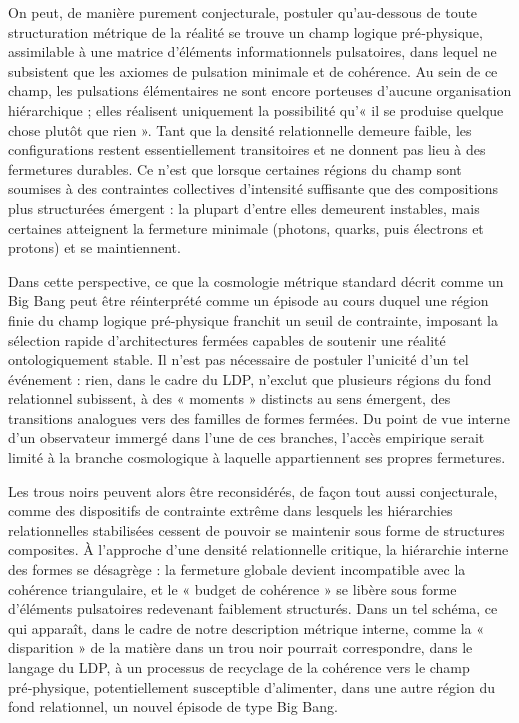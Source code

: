 \documentclass[11pt,a4paper]{article}
\begin{document}
On peut, de manière purement conjecturale, postuler qu’au-dessous de toute structuration métrique de la réalité se trouve un champ logique pré‑physique, assimilable à une matrice d’éléments informationnels pulsatoires, dans lequel ne subsistent que les axiomes de pulsation minimale et de cohérence. Au sein de ce champ, les pulsations élémentaires ne sont encore porteuses d’aucune organisation hiérarchique ; elles réalisent uniquement la possibilité qu’« il se produise quelque chose plutôt que rien ». Tant que la densité relationnelle demeure faible, les configurations restent essentiellement transitoires et ne donnent pas lieu à des fermetures durables. Ce n’est que lorsque certaines régions du champ sont soumises à des contraintes collectives d’intensité suffisante que des compositions plus structurées émergent : la plupart d’entre elles demeurent instables, mais certaines atteignent la fermeture minimale (photons, quarks, puis électrons et protons) et se maintiennent.

Dans cette perspective, ce que la cosmologie métrique standard décrit comme un Big Bang peut être réinterprété comme un épisode au cours duquel une région finie du champ logique pré‑physique franchit un seuil de contrainte, imposant la sélection rapide d’architectures fermées capables de soutenir une réalité ontologiquement stable. Il n’est pas nécessaire de postuler l’unicité d’un tel événement : rien, dans le cadre du LDP, n’exclut que plusieurs régions du fond relationnel subissent, à des « moments » distincts au sens émergent, des transitions analogues vers des familles de formes fermées. Du point de vue interne d’un observateur immergé dans l’une de ces branches, l’accès empirique serait limité à la branche cosmologique à laquelle appartiennent ses propres fermetures. 

Les trous noirs peuvent alors être reconsidérés, de façon tout aussi conjecturale, comme des dispositifs de contrainte extrême dans lesquels les hiérarchies relationnelles stabilisées cessent de pouvoir se maintenir sous forme de structures composites. À l’approche d’une densité relationnelle critique, la hiérarchie interne des formes se désagrège : la fermeture globale devient incompatible avec la cohérence triangulaire, et le « budget de cohérence » se libère sous forme d’éléments pulsatoires redevenant faiblement structurés. Dans un tel schéma, ce qui apparaît, dans le cadre de notre description métrique interne, comme la « disparition » de la matière dans un trou noir pourrait correspondre, dans le langage du LDP, à un processus de recyclage de la cohérence vers le champ pré‑physique, potentiellement susceptible d’alimenter, dans une autre région du fond relationnel, un nouvel épisode de type Big Bang. 
\end{document}

